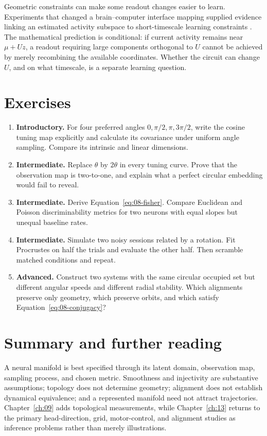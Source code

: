 Geometric constraints can make some readout changes easier to learn. Experiments that changed a brain--computer interface mapping supplied evidence linking an estimated activity subspace to short-timescale learning constraints \citep{app_sadtler2014}. The mathematical prediction is conditional: if current activity remains near $\mu+Uz$, a readout requiring large components orthogonal to $U$ cannot be achieved by merely recombining the available coordinates. Whether the circuit can change $U$, and on what timescale, is a separate learning question.

\section{Exercises}
\begin{enumerate}
\item \textbf{Introductory.} For four preferred angles $0,\pi/2,\pi,3\pi/2$, write the cosine tuning map explicitly and calculate its covariance under uniform angle sampling. Compare its intrinsic and linear dimensions.
\item \textbf{Intermediate.} Replace $\theta$ by $2\theta$ in every tuning curve. Prove that the observation map is two-to-one, and explain what a perfect circular embedding would fail to reveal.
\item \textbf{Intermediate.} Derive Equation~\eqref{eq:08-fisher}. Compare Euclidean and Poisson discriminability metrics for two neurons with equal slopes but unequal baseline rates.
\item \textbf{Intermediate.} Simulate two noisy sessions related by a rotation. Fit Procrustes on half the trials and evaluate the other half. Then scramble matched conditions and repeat.
\item \textbf{Advanced.} Construct two systems with the same circular occupied set but different angular speeds and different radial stability. Which alignments preserve only geometry, which preserve orbits, and which satisfy Equation~\eqref{eq:08-conjugacy}?
\end{enumerate}

\section{Summary and further reading}
A neural manifold is best specified through its latent domain, observation map, sampling process, and chosen metric. Smoothness and injectivity are substantive assumptions; topology does not determine geometry; alignment does not establish dynamical equivalence; and a represented manifold need not attract trajectories. Chapter~\ref{ch:09} adds topological measurements, while Chapter~\ref{ch:13} returns to the primary head-direction, grid, motor-control, and alignment studies as inference problems rather than merely illustrations.
